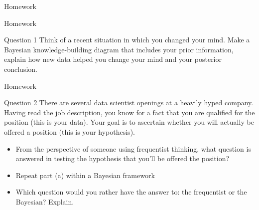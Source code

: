 \documentclass[12pt]{beamer}
\begin{document}
{
\begin{frame}{Homework}
\begin{itemize}
\color{aggiemaroon}{
\item Submit your answers before the next class.
\item You may discuss with peers but submissions must be individual.
\item Responses may be shared anonymously during class discussion!
}
\end{itemize}
\end{frame}

\begin{frame}{Homework}

\begin{block}{Question 1
}
Think of a recent situation in which you changed your mind.
Make a Bayesian knowledge-building diagram that includes your prior information, 
explain how new data helped you change your mind and your posterior conclusion.
\end{block}
\end{frame}

\begin{frame}{Homework}
\begin{block}{Question 2
}
There are several data scientist openings at a heavily hyped company.
Having read the job description, you know for a fact that you are qualified for the position (this is your data).
Your goal is to ascertain whether you will actually be offered a position (this is your hypothesis).
\begin{itemize}
\item[a.] From the perspective of someone using frequentist thinking, 
what question is answered in testing the hypothesis that you’ll be offered the position?
\item[b.] Repeat part (a) within a Bayesian framework
\item[c.] Which question would you rather have the answer to: the frequentist or the Bayesian? Explain.
\end{itemize}
\end{block}
\end{frame}

}
\end{document}
